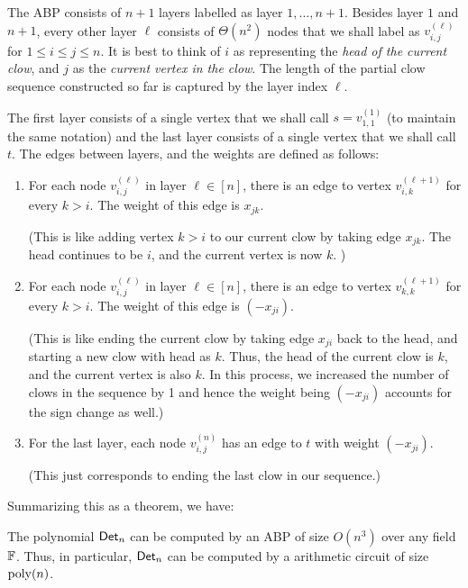 The ABP consists of $n+1$ layers labelled as layer $1,\dots, n+1$. Besides layer $1$ and $n+1$, every other layer $\ell$ consists of $\Theta(n^2)$ nodes that we shall label as $v_{i,j}^{(\ell)}$ for $1\leq i\leq j\leq n$. It is best to think of $i$ as representing the \emph{head of the current clow}, and $j$ as the \emph{current vertex in the clow}. The length of the partial clow sequence constructed so far is captured by the layer index $\ell$. 

The first layer consists of a single vertex that we shall call $s = v_{1,1}^{(1)}$ (to maintain the same notation)  and the last layer consists of a single vertex that we shall call $t$. The edges between layers, and the weights are defined as follows:

\begin{enumerate}
\item For each node $v_{i,j}^{(\ell)}$ in layer $\ell \in [n]$, there is an edge to vertex $v_{i,k}^{(\ell+1)}$ for every $k > i$. The weight of this edge is $x_{jk}$. 

(This is like adding vertex $k > i$ to our current clow by taking edge $x_{jk}$. The head continues to be $i$, and the current vertex is now $k$. )
\item For each node $v_{i,j}^{(\ell)}$ in layer $\ell \in [n]$, there is an edge to vertex $v_{k,k}^{(\ell+1)}$ for every $k > i$. The weight of this edge is $(-x_{ji})$. 

(This is like ending the current clow by taking edge $x_{ji}$ back to the head, and starting a new clow with head as $k$. Thus, the head of the current clow is $k$, and the current vertex is also $k$. In this process, we increased the number of clows in the sequence by 1 and hence the weight being $(-x_{ji})$ accounts for the sign change as well.)

\item For the last layer, each node $v_{i,j}^{(n)}$ has an edge to $t$ with weight $(-x_{ji})$. 

(This just corresponds to ending the last clow in our sequence.)
\end{enumerate}


\noindent
Summarizing this as a theorem, we have:

\begin{theorem}[\cite{mv97}]\label{thm:det-abp}
The polynomial $\mathsf{Det}_n$ can be computed by an ABP of size $O(n^3)$ over any field $\mathbb{F}$. Thus, in particular, $\mathsf{Det}_n$ can be computed by a arithmetic circuit of size $\mathrm{poly}(n)$. 
\end{theorem}


